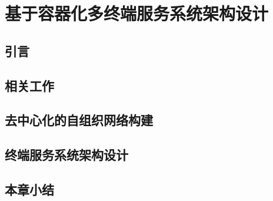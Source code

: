 \chapter{基于容器化多终端服务系统架构设计 }\label{chap:service_system}

\section{引言}
\section{相关工作}
\section{去中心化的自组织网络构建}
\section{终端服务系统架构设计}
\section{本章小结}